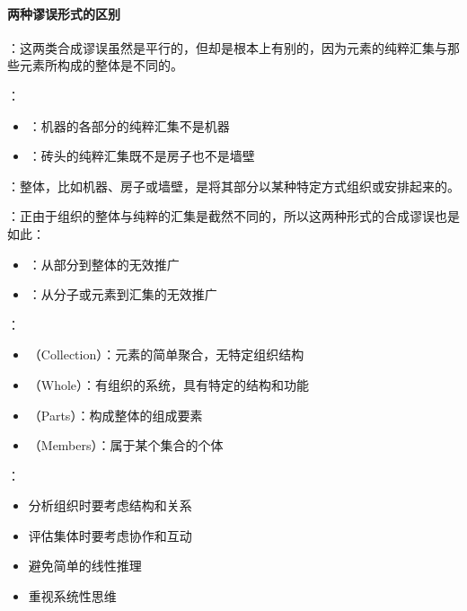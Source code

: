 \paragraph{两种谬误形式的区别}
\begin{examplebox}[title=两种谬误形式的区别]
：这两类合成谬误虽然是平行的，但却是根本上有别的，因为元素的纯粹汇集与那些元素所构成的整体是不同的。

：
\begin{itemize}
  \item {}：机器的各部分的纯粹汇集不是机器
  \item {}：砖头的纯粹汇集既不是房子也不是墙壁
\end{itemize}

：整体，比如机器、房子或墙壁，是将其部分以某种特定方式组织或安排起来的。

：正由于组织的整体与纯粹的汇集是截然不同的，所以这两种形式的合成谬误也是如此：
\begin{itemize}
  \item {}：从部分到整体的无效推广
  \item {}：从分子或元素到汇集的无效推广
\end{itemize}

：
\begin{itemize}
  \item {}（Collection）：元素的简单聚合，无特定组织结构
  \item {}（Whole）：有组织的系统，具有特定的结构和功能
  \item {}（Parts）：构成整体的组成要素
  \item {}（Members）：属于某个集合的个体
\end{itemize}

：
\begin{itemize}
  \item 分析组织时要考虑结构和关系
  \item 评估集体时要考虑协作和互动
  \item 避免简单的线性推理
  \item 重视系统性思维
\end{itemize}
\end{examplebox}